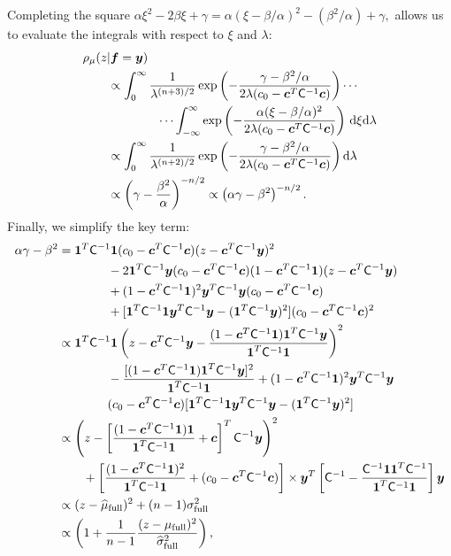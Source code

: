 \documentclass{iitthesis}          %
\newcommand{\bm}[1]{\boldsymbol{#1}}
\newcommand{\D}[1]{\text{d}{#1}}
\newcommand{\vc}{\bm{c}}
\newcommand{\vf}{\bm{f}}
\newcommand{\vy}{\bm{y}}
\newcommand{\vone}{\bm{1}}
\newcommand{\mC}{\mathsf{C}}
\begin{document}
Completing the square $
\alpha \xi^2 -2 \beta \xi + \gamma 
= \alpha (\xi -\beta/\alpha)^2  - (\beta^2/\alpha) + \gamma,
$
allows us to evaluate the integrals with respect to $\xi$ and $\lambda$:
\begin{align*}
\MoveEqLeft{\rho_{\mu}(z | \vf = \vy)} \\
& \propto \displaystyle \int_{0}^\infty  \frac{1}{\lambda^{(n+3)/2}}  \exp\left( -\frac{  \gamma - \beta^2/\alpha}{2\lambda(c_0  -\vc ^T \mC^{-1} \vc)} \right)  \cdots \\
& \qquad \qquad \cdots \int_{-\infty}^\infty  \exp\left( -\frac{\alpha (\xi -\beta/\alpha)^2}{2\lambda(c_0  -\vc ^T \mC^{-1} \vc)} \right) \, \D \xi \D \lambda \\
& \propto \displaystyle \int_{0}^\infty  \frac{1}{\lambda^{(n+2)/2}}  \exp\left( -\frac{  \gamma - \beta^2/\alpha}{2\lambda(c_0  -\vc ^T \mC^{-1} \vc)} \right) \D \lambda \\
& \propto \left(\gamma - \frac{\beta^2}{\alpha}\right)^{-n/2} \propto \left(\alpha \gamma - \beta^2\right)^{-n/2}.
\end{align*}
Finally, we simplify the key term:
\begin{align*}
\alpha \gamma - \beta^2 
& = \vone^T \mC^{-1} \vone (c_0  -\vc ^T \mC^{-1} \vc) (z - \vc^T \mC^{-1} \vy )^2 \\
& \qquad \qquad - 2 \vone^T \mC^{-1} \vy (c_0  -\vc ^T \mC^{-1} \vc)(1 - \vc^T \mC^{-1} \vone)(z - \vc^T \mC^{-1} \vy ) \\
& \qquad \qquad + (1 - \vc^T \mC^{-1} \vone)^2 \vy^T \mC^{-1} \vy (c_0  -\vc ^T \mC^{-1} \vc) \\
&\qquad \qquad  + [\vone^T \mC^{-1} \vone \vy^T \mC^{-1} \vy - (\vone^T \mC^{-1} \vy)^2](c_0  -\vc ^T \mC^{-1} \vc)^2  \\
& \propto \vone^T \mC^{-1} \vone  \left (z - \vc^T \mC^{-1} \vy - \frac{(1 - \vc^T \mC^{-1} \vone)\vone^T \mC^{-1} \vy}{\vone^T \mC^{-1} \vone } \right )^2 \\
& \qquad \qquad -  \frac{[(1 - \vc^T \mC^{-1} \vone)\vone^T \mC^{-1} \vy]^2}{\vone^T \mC^{-1} \vone }  
+ (1 - \vc^T \mC^{-1} \vone)^2 \vy^T \mC^{-1} \vy \\
& \qquad \qquad (c_0  -\vc ^T \mC^{-1} \vc) [\vone^T \mC^{-1} \vone  \vy^T \mC^{-1} \vy
- (\vone^T \mC^{-1} \vy)^2] \\
& \propto \left (z - \left[ \frac{(1 - \vc^T \mC^{-1} \vone)\vone}{\vone^T \mC^{-1} \vone } + \vc \right]^T \mC^{-1} \vy \right )^2 \\
& \qquad  + \left[\frac{(1 - \vc^T \mC^{-1} \vone)^2}{\vone^T \mC^{-1} \vone} + (c_0  -\vc ^T \mC^{-1} \vc) \right] \times \vy^T\left[ \mC^{-1} 
- \frac{ \mC^{-1} \vone\vone^T \mC^{-1}}{\vone^T \mC^{-1} \vone}  \right]\vy
\\
& \propto (z - \widehat{\mu}_{\textup{full}})^2 + (n-1) \sigma_{\textup{full}}^2
\\
& \propto \left(1 +  \frac{1}{n-1} \frac{(z - \mu_{\textup{full}})^2}{\widehat{\sigma}_{\textup{full}}^2} \right),
\end{align*}
\end{document}
